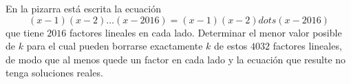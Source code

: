 En la pizarra está escrita la ecuación
\[(x − 1)(x − 2) \dots (x − 2016) = (x − 1)(x − 2) dots (x − 2016)\]
que tiene $2016$ factores lineales en cada lado. Determinar el menor valor posible de $k$ para el cual pueden borrarse exactamente $k$ de estos $4032$ factores lineales, de modo que al menos quede un factor en cada lado y la ecuación que resulte no tenga soluciones reales.